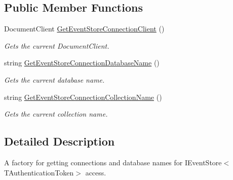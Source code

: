 \subsection*{Public Member Functions}
\begin{DoxyCompactItemize}
\item 
Document\+Client \hyperlink{interfaceCqrs_1_1Azure_1_1DocumentDb_1_1Events_1_1IAzureDocumentDbEventStoreConnectionStringFactory_a2b5e3449d906b74736fee450975ad358_a2b5e3449d906b74736fee450975ad358}{Get\+Event\+Store\+Connection\+Client} ()
\begin{DoxyCompactList}\small\item\em Gets the current Document\+Client. \end{DoxyCompactList}\item 
string \hyperlink{interfaceCqrs_1_1Azure_1_1DocumentDb_1_1Events_1_1IAzureDocumentDbEventStoreConnectionStringFactory_a826c95e8dab31be9ef97cf3bea92d95d_a826c95e8dab31be9ef97cf3bea92d95d}{Get\+Event\+Store\+Connection\+Database\+Name} ()
\begin{DoxyCompactList}\small\item\em Gets the current database name. \end{DoxyCompactList}\item 
string \hyperlink{interfaceCqrs_1_1Azure_1_1DocumentDb_1_1Events_1_1IAzureDocumentDbEventStoreConnectionStringFactory_a4268ad0884bad88528a5eb10292d9d3b_a4268ad0884bad88528a5eb10292d9d3b}{Get\+Event\+Store\+Connection\+Collection\+Name} ()
\begin{DoxyCompactList}\small\item\em Gets the current collection name. \end{DoxyCompactList}\end{DoxyCompactItemize}


\subsection{Detailed Description}
A factory for getting connections and database names for I\+Event\+Store$<$\+T\+Authentication\+Token$>$ access. 



